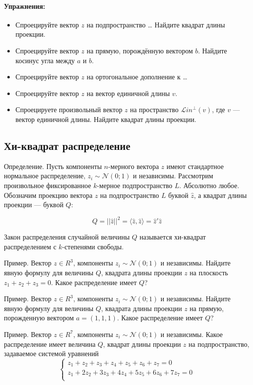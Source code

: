 \documentclass[11pt,russian,]{article}
\let\oldparagraph\paragraph
\renewcommand{\paragraph}[1]{\oldparagraph{#1}\mbox{}}
\newcommand{\cN}{\mathcal{N}}
\newcommand{\1}{\mathbbm{1}}
\newcommand{\Lin}{\mathcal{L}in}
\newcommand{\Linp}{\Lin^{\perp}}
\begin{document}
\paragraph{Упражнения:}\label{-1}

\begin{itemize}
\item
  Спроецируйте вектор \(z\) на подпространство \ldots{} Найдите квадрат
  длины проекции.
\item
  Спроецируйте вектор \(z\) на прямую, порождённую вектором \(b\).
  Найдите косинус угла между \(a\) и \(b\).
\item
  Спроецируйте вектор \(z\) на ортогональное дополнение к \ldots{}
\item
  Спроецируйте вектор \(z\) на вектор единичной длины \(v\).
\item
  Спроецируете произвольный вектор \(z\) на пространство \(\Linp(v)\),
  где \(v\) --- вектор единичной длины. Найдите квадрат длины проекции.
\end{itemize}

\subsection{Хи-квадрат распределение}\label{--}

Определение. Пусть компоненты \(n\)-мерного вектора \(z\) имеют
стандартное нормальное распределение, \(z_i \sim \cN(0;1)\) и
независимы. Рассмотрим произвольное фиксированное \(k\)-мерное
подпространство \(L\). Абсолютно любое. Обозначим проекцию вектора \(z\)
на подпространство \(L\) буквой \(\hat z\), а квадрат длины проекции ---
буквой \(Q\):

\[
Q = ||\hat z||^2 = \langle \hat z, \hat z\rangle = \hat z'\hat z
\]

Закон распределения случайной величины \(Q\) называется хи-квадрат
распределением с \(k\)-степенями свободы.

Пример. Вектор \(z \in R^3\), компоненты \(z_i \sim \cN(0;1)\) и
независимы. Найдите явную формулу для величины \(Q\), квадрата длины
проекции \(z\) на плоскость \(z_1 + z_2 + z_3 =0\). Какое распределение
имеет \(Q\)?

Пример. Вектор \(z \in R^3\), компоненты \(z_i \sim \cN(0;1)\) и
независимы. Найдите явную формулу для величины \(Q\), квадрата длины
проекции \(z\) на прямую, порожденную вектором \(a = (1, 1, 1)\). Какое
распределение имеет \(Q\)?

Пример. Вектор \(z \in R^7\), компоненты \(z_i \sim \cN(0;1)\) и
независимы. Какое распределение имеет величина \(Q\), квадрат длины
проекции \(z\) на подпространство, задаваемое системой уравнений \[
\begin{cases}
z_1 + z_2 + z_3 +z_4 + z_5 +z_6 + z_7 = 0 \\
z_1 + 2z_2 +3z_3 +4z_4 +5z_5+6z_6+7z_7 =0 \\
\end{cases}
\]
\end{document}
